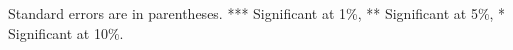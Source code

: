 \begin{table}[!htbp]
\begin{threeparttable}
\begin{tablenotes}
\item Standard errors are in parentheses. *** Significant at 1\%, ** Significant at 5\%, * Significant at 10\%.
\end{tablenotes}
\end{threeparttable}
\end{table} 




